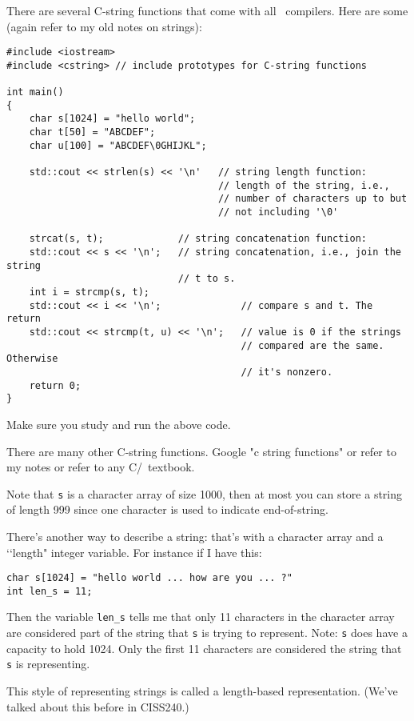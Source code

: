 There are several C-string functions that come with all \cpp\ compilers.
Here are some (again refer to
my old notes on strings):
{\small
\begin{Verbatim}[frame=single, commandchars=\~\@\!]
#include <iostream>
#include <cstring> // include prototypes for C-string functions

int main()
{
    char s[1024] = "hello world";
    char t[50] = "ABCDEF";
    char u[100] = "ABCDEF\0GHIJKL";

    std::cout << strlen(s) << '\n'   // string length function:
                                     // length of the string, i.e.,
                                     // number of characters up to but
                                     // not including '\0'

    strcat(s, t);             // string concatenation function:
    std::cout << s << '\n';   // string concatenation, i.e., join the string
                              // t to s.
    int i = strcmp(s, t);
    std::cout << i << '\n';              // compare s and t. The return
    std::cout << strcmp(t, u) << '\n';   // value is 0 if the strings
                                         // compared are the same. Otherwise
                                         // it's nonzero.
    return 0;
}
\end{Verbatim}
}
Make sure you study and run the above code.

There are many other C-string functions. Google "c string functions" or
refer to my notes or refer to any
C/\cpp\ textbook.

Note that \verb!s! is a character array of size 1000, then at most you
can store a string of length 999 since
one character is used to indicate end-of-string.

There's another way to describe a string: that's with a character array and
a \lq\lq length" integer variable.
For instance if I have this:
{\small
\begin{Verbatim}[frame=single, commandchars= \~\@\!]
char s[1024] = "hello world ... how are you ... ?"
int len_s = 11;
\end{Verbatim}
}
Then the variable \verb!len_s! tells me that only 11 characters in the
character array are considered part of the
string that \verb!s! is trying to represent. Note: \verb!s! does have a
capacity to hold 1024. Only the first 11
characters are considered the string that \verb!s! is representing.

This style of representing strings is called a length-based representation.
(We've talked about this before
in CISS240.)

